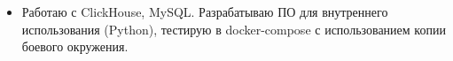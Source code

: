 \begin{itemize}
    \item Работаю с ClickHouse, MySQL. Разрабатываю ПО для внутреннего использования (Python), тестирую в docker-compose с использованием копии боевого окружения.
\end{itemize}
